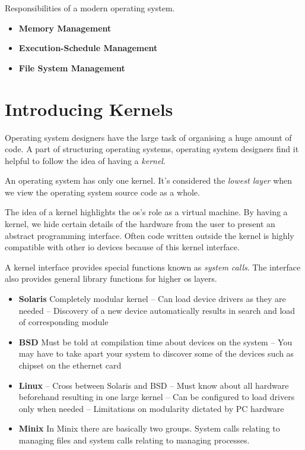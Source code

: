 Responsibilities of a modern operating system.
\begin{itemize}   
\renewcommand{\labelitemi}{$\Box$}
\item \textbf{Memory Management} %
\item \textbf{Execution-Schedule Management} 
\item \textbf{File System Management} 
\end{itemize}



\section{Introducing Kernels}



Operating system designers have the large task of 
organising a huge amount of code. 
A part of structuring operating systems,
operating system designers find it helpful to follow the idea of having a \textit{kernel}.


An operating system has only one kernel.
It's considered the \textit{lowest layer} 
when we view the operating system source code as a whole. 

The idea of a kernel highlights the os's role as a virtual machine. 
By having a kernel, we hide certain details of the hardware from the user to present an 
abstract programming interface. Often code written outside the kernel is 
highly compatible with other io devices because of this kernel interface. 

A kernel interface provides special functions known as \textit{system calls}.
The interface also provides general library functions for higher os layers. 






\begin{itemize}   
\renewcommand{\labelitemi}{$\Box$}
\item \textbf{Solaris} 
Completely modular kernel
– Can load device drivers as they are needed
– Discovery of a new device automatically results in search and load of corresponding module
\item \textbf{BSD} 
Must be told at compilation time about devices on the system
– You may have to take apart your system to discover some of the devices such as chipset on the ethernet card
\item \textbf{Linux} 
– Cross between Solaris and BSD
– Must know about all hardware beforehand resulting in one large kernel
– Can be conﬁgured to load drivers only when needed
– Limitations on modularity dictated by PC hardware 
\item \textbf{Minix} 
In Minix there are basically two groups. System calls relating to managing files and 
system calls relating to managing processes. 
\end{itemize}

